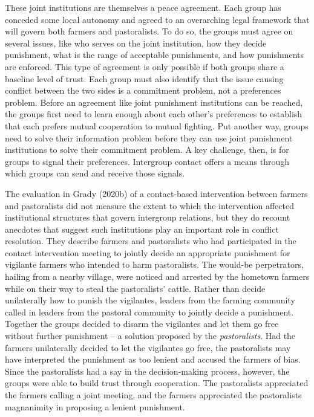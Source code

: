 \documentclass[11pt]{article}
\begin{document}
These joint institutions are themselves a peace agreement. Each group
has conceded some local autonomy and agreed to an overarching legal
framework that will govern both farmers and pastoralists. To do so, the
groups must agree on several issues, like who serves on the joint
institution, how they decide punishment, what is the range of acceptable
punishments, and how punishments are enforced. This type of agreement is
only possible if both groups share a baseline level of trust. Each group
must also identify that the issue causing conflict between the two sides
is a commitment problem, not a preferences problem. Before an agreement
like joint punishment institutions can be reached, the groups first need
to learn enough about each other's preferences to establish that each
prefers mutual cooperation to mutual fighting. Put another way, groups
need to solve their information problem before they can use joint
punishment institutions to solve their commitment problem. A key
challenge, then, is for groups to signal their preferences. Intergroup
contact offers a means through which groups can send and receive those
signals.

The evaluation in Grady (2020b) of a contact-based intervention between
farmers and pastoralists did not measure the extent to which the
intervention affected institutional structures that govern intergroup
relations, but they do recount anecdotes that suggest such institutions
play an important role in conflict resolution. They describe farmers and
pastoralists who had participated in the contact intervention meeting to
jointly decide an appropriate punishment for vigilante farmers who
intended to harm pastoralists. The would-be perpetrators, hailing from a
nearby village, were noticed and arrested by the hometown farmers while
on their way to steal the pastoralists' cattle. Rather than decide
unilaterally how to punish the vigilantes, leaders from the farming
community called in leaders from the pastoral community to jointly
decide a punishment. Together the groups decided to disarm the
vigilantes and let them go free without further punishment -- a solution
proposed by the \emph{pastoralists}. Had the farmers unilaterally
decided to let the vigilantes go free, the pastoralists may have
interpreted the punishment as too lenient and accused the farmers of
bias. Since the pastoralists had a say in the decision-making process,
however, the groups were able to build trust through cooperation. The
pastoralists appreciated the farmers calling a joint meeting, and the
farmers appreciated the pastoralists magnanimity in proposing a lenient
punishment.
\end{document}
